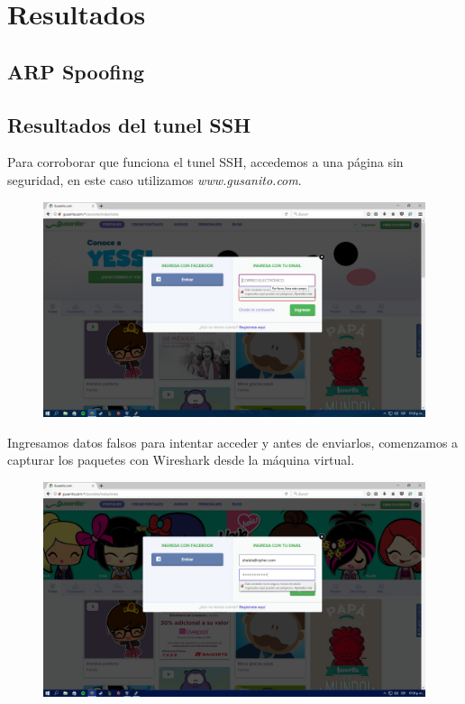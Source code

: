 \documentclass{article}
\begin{document}
\section{Resultados}
\subsection{ARP Spoofing}
\subsection{Resultados del tunel SSH}
Para corroborar que funciona el tunel SSH, accedemos a una p\'agina sin seguridad, en este caso utilizamos \emph{www.gusanito.com}.

\begin{figure}[H]
\centering
\includegraphics[width=1\textwidth]{14-GUSANITO}
\end{figure}

Ingresamos datos falsos para intentar acceder y antes de enviarlos, comenzamos a capturar los paquetes con Wireshark desde la m\'aquina virtual.

\begin{figure}[H]
\centering
\includegraphics[width=1\textwidth]{15-CORREO}
\end{figure}
\end{document}

